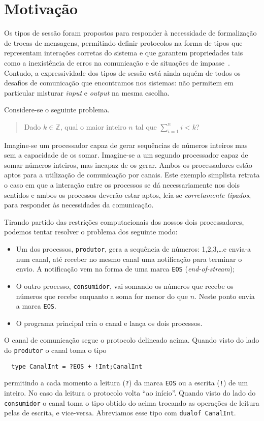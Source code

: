 \section{Motivação}

Os tipos de sessão foram propostos para responder à necessidade de
formalização de trocas de mensagens, permitindo definir protocolos na
forma de tipos que representam interações corretas do sistema e que
garantem propriedades tais como a inexistência de erros na comunicação
e de situações de impasse~\cite{ref-lang-primitives}. Contudo, a
expressividade dos tipos de sessão está ainda aquém de todos os
desafios de comunicação que encontramos nos sistemas: não permitem em
particular misturar \textit{input} e \textit{output} na mesma escolha.

Considere-se o seguinte problema.
%
\begin{quotation}
	Dado $k\in\mathbb{Z}$, qual o maior inteiro $n$ tal que
	$\sum_{i=1}^n i < k$?
\end{quotation}

Imagine-se um processador capaz de gerar sequências de números
inteiros mas sem a capacidade de os somar. Imagine-se a um
segundo processador capaz de somar números inteiros, mas incapaz de os
gerar. Ambos os processadores estão aptos para a utilização de
comunicação por canais.
%
Este exemplo simplista retrata o caso em que a interação entre
os processos se dá necessariamente nos dois sentidos e ambos 
os processos deverão
estar aptos, leia-se \emph{corretamente tipados}, para responder 
às necessidades da comunicação.

Tirando partido das restrições computacionais dos nossos dois
processadores, podemos tentar resolver o problema dos seguinte modo:
%
\begin{itemize}
\item Um dos processos, \lstinline|produtor|, gera a sequência de
  números: 1,2,3,\dots e envia-a num canal, até receber no mesmo
  canal uma notificação para terminar o envio. A notificação vem na
  forma de uma marca \lstinline|EOS| (\textit{end-of-stream});
\item O outro processo, \lstinline|consumidor|, vai somando os números
  que recebe os números que recebe enquanto a soma for menor do que
  $n$. Neste ponto envia a marca \lstinline|EOS|.
\item O programa principal cria o canal e lança os dois processos.
\end{itemize}

O canal de comunicação segue o  protocolo delineado acima. Quando
visto do lado do \lstinline|produtor| o canal toma o tipo
%
\begin{lstlisting}
  type CanalInt = ?EOS + !Int;CanalInt
\end{lstlisting}
%
permitindo a cada momento a leitura (\lstinline|?|) da marca
\lstinline|EOS| ou a escrita (\lstinline|!|) de um inteiro. No caso da
leitura o protocolo volta ``ao início''.
%
Quando visto do lado do \lstinline|consumidor| o canal toma o tipo
obtido do acima trocando as operações de leitura pelas de escrita, e
vice-versa. Abreviamos esse tipo com \lstinline|dualof CanalInt|.


